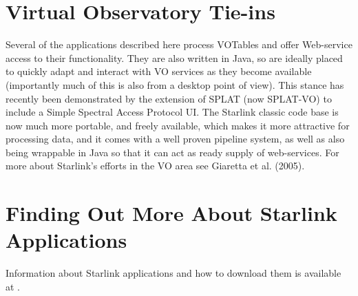 \documentclass[11pt,twoside]{article}  %
\begin{document}
\section{Virtual Observatory Tie-ins}

Several of the applications described here process VOTables and offer
Web-service access to their functionality.
They are also written in Java, so are ideally placed to quickly adapt and
interact with VO services as they become available (importantly much of this is
also from a desktop point of view). 
This stance has recently been demonstrated by the extension of SPLAT (now
SPLAT-VO) to include a Simple Spectral Access Protocol UI.
The Starlink classic code base is now much more portable, and freely
available, which makes it more attractive for processing data, and it comes
with a well proven pipeline system, as well as also being wrappable in Java so
that it can act as ready supply of web-services.
For more about Starlink's efforts in the VO area see Giaretta et al. (2005).

\section{Finding Out More About Starlink Applications}

Information about Starlink applications and how to download them is available
at .
\end{document}
